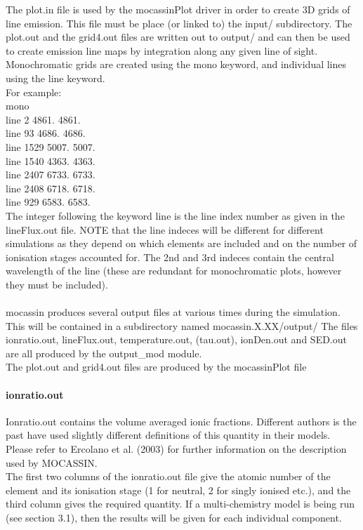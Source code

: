 \documentclass[11pt]{article}
\begin{document}
    The plot.in file is used by the mocassinPlot driver in order to create 3D 
    grids of line emission. This file must be place (or linked to) the input/ 
    subdirectory. The plot.out and the grid4.out files are written out to output/ and 
    can then be used to create emission line
    maps by integration along any given line of sight.      \\
    Monochromatic grids are created using the mono keyword, and individual lines 
    using the line keyword. \\
\noindent    For example:\\
\indent  mono\\
\indent  line 2        4861.   4861.\\
\indent  line 93       4686.   4686.\\
\indent  line 1529     5007.   5007.\\
\indent  line 1540     4363.   4363.\\
\indent  line 2407     6733.   6733.\\
\indent  line 2408     6718.   6718.\\
\indent  line 929      6583.   6583.\\
\noindent The integer following the keyword line is the line index number as given in the 
    lineFlux.out file. NOTE that the line indeces will be different for different 
    simulations as they depend on which elements are included and on the number of 
    ionisation stages accounted for. The 2nd and 3rd indeces contain the central 
    wavelength of the line (these are redundant for monochromatic plots, however
    they must be included).      	\\

\\
    
    {\sc mocassin} produces several output files at various times during the simulation. 
    This will be contained in a subdirectory named mocassin.X.XX/output/
    The files ionratio.out,  lineFlux.out, temperature.out, (tau.out), ionDen.out
    and SED.out are all produced by the output\_mod module. \\
    The plot.out and grid4.out files are produced by the mocassinPlot file\\

\paragraph{    ionratio.out}
    Ionratio.out contains the volume averaged ionic fractions. Different authors 
    is the past have used slightly different definitions of this quantity in their 
    models. Please refer to Ercolano et al. (2003) for further information on the 
    description used by MOCASSIN. \\
    The first two columns of the ionratio.out file give the atomic number of the 
    element and its ionisation stage (1 for neutral, 2 for singly ionised etc.), 
    and the third column gives the required quantity.
    If a multi-chemistry model is being run (see section 3.1), then the results 
    will be given for each individual component. \\
\end{document}
